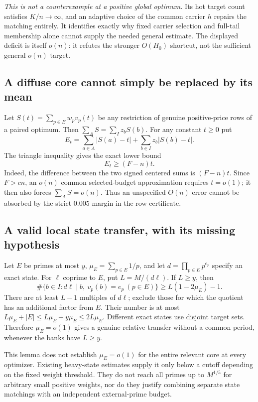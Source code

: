\documentclass[11pt,a4paper]{article}
\begin{document}
\emph{This is not a counterexample at a positive global optimum.}
Its hot target count satisfies $K/n\to\infty$, and an adaptive choice
of the common carrier $h$ repairs the matching entirely. It identifies
exactly why fixed carrier selection and full-tail membership alone
cannot supply the needed general estimate.
The displayed deficit is itself $o(n)$: it refutes the stronger
$O(H_0)$ shortcut, not the sufficient general $o(n)$ target.

\subsection{A diffuse core cannot simply be replaced by its mean}
Let $S(t)=\sum_{p\in E}w_pv_p(t)$ be any restriction of genuine
positive-price rows of a paired optimum. Then
$\sum_AS=\sum_Iz_bS(b)$. For any constant $t\ge0$ put
\[
 E_t=\sum_{a\in A}|S(a)-t|+\sum_{b\in I}z_b|S(b)-t|.
\]
The triangle inequality gives the exact lower bound
\begin{equation}
 \boxed{E_t\ge(F-n)t.}                                \label{eq:constantobstruction}
\end{equation}
Indeed, the difference between the two signed centered sums is
$(F-n)t$. Since $F>cn$, an $o(n)$ common selected-budget
approximation requires $t=o(1)$; it then also forces
$\sum_AS=o(n)$. Thus an unspecified $O(n)$ error cannot be absorbed
by the strict $0.005$ margin in the row certificate.

\subsection{A valid local state transfer, with its missing hypothesis}
Let $E$ be primes at most $y$, $\mu_E=\sum_{p\in E}1/p$, and let
$d=\prod_{p\in E}p^{e_p}$ specify an exact state. For $\ell$ coprime
to $E$, put $L=M/(d\ell)$. If $L\ge y$, then
\begin{equation}
 \#\{b\in I:d\ell\mid b,\ v_p(b)=e_p\ (p\in E)\}
 \ge L(1-2\mu_E)-1.                                  \label{eq:state}
\end{equation}
There are at least $L-1$ multiples of $d\ell$; exclude those for which
the quotient has an additional factor from $E$. Their number is at
most $L\mu_E+|E|\le L\mu_E+y\mu_E\le2L\mu_E$.
Different exact states use disjoint target sets. Therefore
$\mu_E=o(1)$ gives a genuine relative transfer without a common
period, whenever the banks have $L\ge y$.

This lemma does not establish $\mu_E=o(1)$ for the entire relevant
core at every optimizer. Existing heavy-state estimates supply it only
below a cutoff depending on the fixed weight threshold. They do not
reach all primes up to $M^{1/5}$ for arbitrary small positive weights,
nor do they justify combining separate state matchings with an
independent external-prime budget.
\end{document}
